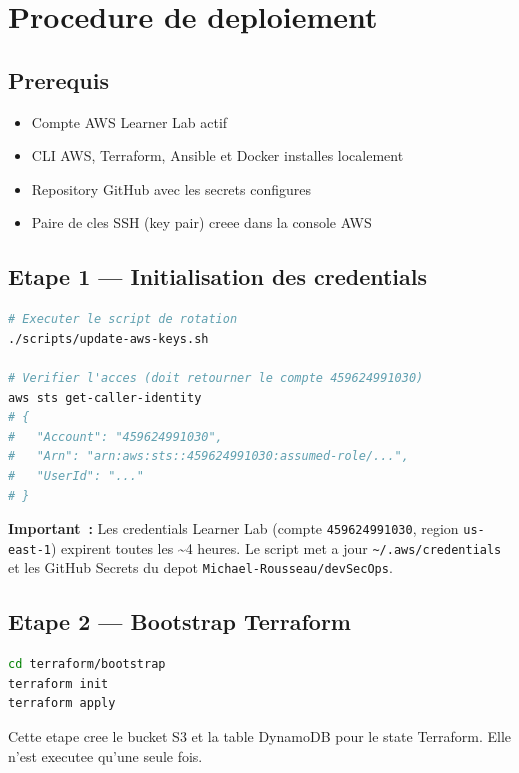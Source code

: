 \chapter{Procedure de deploiement}

\section{Prerequis}

\begin{itemize}
    \item Compte AWS Learner Lab actif
    \item CLI AWS, Terraform, Ansible et Docker installes localement
    \item Repository GitHub avec les secrets configures
    \item Paire de cles SSH (key pair) creee dans la console AWS
\end{itemize}

\section{Etape 1 --- Initialisation des credentials}

\begin{lstlisting}[language=bash,caption={Rotation des cles Learner Lab}]
# Executer le script de rotation
./scripts/update-aws-keys.sh

# Verifier l'acces (doit retourner le compte 459624991030)
aws sts get-caller-identity
# {
#   "Account": "459624991030",
#   "Arn": "arn:aws:sts::459624991030:assumed-role/...",
#   "UserId": "..."
# }
\end{lstlisting}

\textbf{Important~:} Les credentials Learner Lab (compte \texttt{459624991030},
region \texttt{us-east-1}) expirent toutes les \~{}4 heures.
Le script met a jour \texttt{\~{}/.aws/credentials} et les GitHub Secrets
du depot \texttt{Michael-Rousseau/devSecOps}.

\section{Etape 2 --- Bootstrap Terraform}

\begin{lstlisting}[language=bash,caption={Creation du bucket d'etat}]
cd terraform/bootstrap
terraform init
terraform apply
\end{lstlisting}

Cette etape cree le bucket S3 et la table DynamoDB pour le state Terraform.
Elle n'est executee qu'une seule fois.

